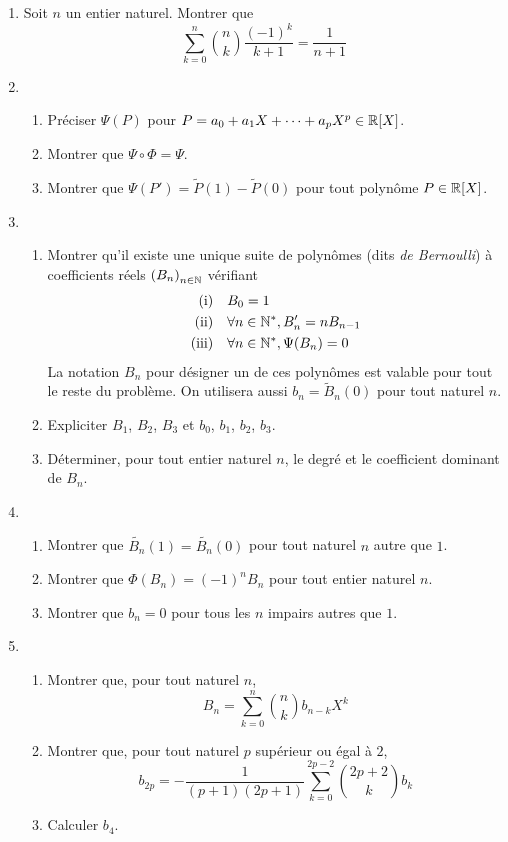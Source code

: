 \begin{enumerate}
 \item Soit $n$ un entier naturel. Montrer que
\begin{displaymath}
 \sum_{k=0}^n\binom{n}{k}\frac{(-1)^k}{k+1} = \frac{1}{n+1}
\end{displaymath}
\item 
\begin{enumerate}
 \item Préciser $\Psi(P)$ pour $P=a_0+a_1X+\cdots+a_pX^p\in \mathbb{R}[X]$.
 \item  Montrer que $\Psi \circ \Phi = \Psi$.
 \item Montrer que $\Psi(P')=\widetilde{P}(1)-\widetilde{P}(0)$ pour tout polynôme $P\in \mathbb{R}[X]$.
\end{enumerate}
\item 
\begin{enumerate}
 \item Montrer qu'il existe une unique suite de polynômes (dits \emph{de Bernoulli}) à coefficients réels $\left( B_n\right)_{n\in \mathbb{N}}$ vérifiant
\begin{align*}
 \text{(i)}& & &B_0 = 1 \\
 \text{(ii)}& & &\forall n\in \mathbb{N}^*, B_n'=nB_{n-1} \\
 \text{(iii)}& & &\forall n\in \mathbb{N}^*, \Psi(B_n)=0
\end{align*}
La notation $B_n$ pour désigner un de ces polynômes est valable pour tout le reste du problème. On utilisera aussi $b_n=\widetilde{B}_n(0)$ pour tout naturel $n$. 
\item Expliciter $B_1$, $B_2$, $B_3$ et $b_0$, $b_1$, $b_2$, $b_3$.
\item Déterminer, pour tout entier naturel $n$, le degré et le coefficient dominant de $B_n$.
\end{enumerate}

\item
\begin{enumerate}
 \item Montrer que $\widetilde{B_n}(1)=\widetilde{B_n}(0)$ pour tout naturel $n$ autre que $1$.
 \item Montrer que $\Phi(B_n)=(-1)^n B_n$ pour tout entier naturel $n$.
 \item Montrer que $b_n=0$ pour tous les $n$ impairs autres que $1$.
\end{enumerate}


\item \begin{enumerate}
\item Montrer que, pour tout naturel $n$,
\begin{displaymath}
 B_n = \sum_{k=0}^n\binom{n}{k}b_{n-k}X^k
\end{displaymath}
\item Montrer que, pour tout naturel $p$ supérieur ou égal à $2$,
\begin{displaymath}
 b_{2p}=-\frac{1}{(p+1)(2p+1)}\sum_{k=0}^{2p-2}\binom{2p+2}{k}b_k
\end{displaymath}
\item Calculer $b_4$.
\end{enumerate}


\end{enumerate}
